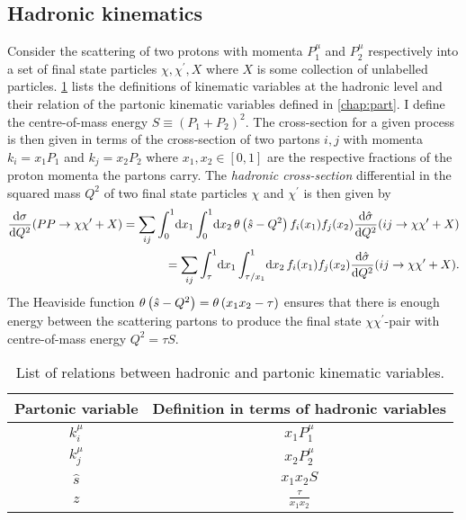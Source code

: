 \documentclass[../main.tex]{subfiles}
\begin{document}
\subsection{Hadronic kinematics}
Consider the scattering of two protons with momenta \(P_1^\mu\) and \(P_2^\mu\) respectively into a set of final state particles \(\chi, \chi^\prime, X\) where \(X\) is some collection of unlabelled particles.
\cref{had:tab:had_kinematic_variables} lists the definitions of kinematic variables at the hadronic level and their relation of the partonic kinematic variables defined in \cref{chap:part}.
I define the centre-of-mass energy \(S \equiv (P_1 + P_2)^2\).
The cross-section for a given process is then given in terms of the cross-section of two partons \(i, j\) with momenta \(k_i = x_1 P_1\) and \(k_j = x_2 P_2\) where \(x_1, x_2 \in [0, 1]\) are the respective fractions of the proton momenta the partons carry.
The \emph{hadronic cross-section} differential in the squared mass \(Q^2\) of two final state particles \(\chi\) and \(\chi^\prime\) is then given by
\begin{align}
  \label{had:eq:dsigma_dQ2}
  \nonumber
  \d[Q^2]{\sigma}(PP \to \chi \chi^\prime + X) = \sum_ {ij} \integral[_0^1]{x_1}\!\integral[_0^1]{x_2} \theta\pclosed{\hat{s} - Q^2} f_i(x_1) f_j(x_2) \d[Q^2]{\hat\sigma}(ij \to \chi\chi^\prime + X) \\
  = \sum_ {ij} \integral[_\tau^1]{x_1}\!\integral[_{\tau/x_1}^1]{x_2} f_i(x_1) f_j(x_2) \d[Q^2]{\hat\sigma}(ij \to \chi\chi^\prime + X).
\end{align}
The Heaviside function \(\theta\left(\hat{s}-Q^2\right) = \theta\left(x_1 x_2 - \tau\right)\) ensures that there is enough energy between the scattering partons to produce the final state \(\chi \chi^\prime\)-pair with centre-of-mass energy \(Q^2 = \tau S\).

\begin{table}[ht!]
  \centering
  \begin{tabular}{|c|c|}
    \hline
    Partonic variable & Definition in terms of hadronic variables \\
    \hline
    \(k_i^\mu\)       & \(x_1 P_1^\mu\)                           \\
    \(k_j^\mu\)       & \(x_2 P_2^\mu\)                           \\
    \(\hat{s}\)       & \(x_1 x_2 S\)                             \\
    \(z\)             & \(\frac{\tau}{x_1x_2}\)                   \\
    \hline
  \end{tabular}
  \caption{List of relations between hadronic and partonic kinematic variables.}
  \label{had:tab:had_kinematic_variables}
\end{table}
\end{document}
